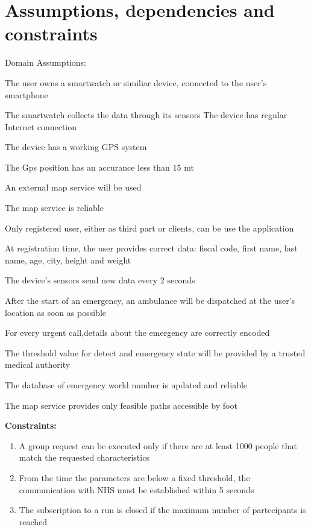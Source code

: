 \section{Assumptions, dependencies and constraints}
Domain Assumptions:
\begin{enumerate}[label={[}D.\arabic*{]}]

\item \label{d:1}
The user owns a smartwatch or similiar device, connected to the user’s smartphone
\item\label{d:2}
The smartwatch collects the data through its sensors
\itm\label{d:3}
The device has regular Internet connection 
\item\label{d:4}
The device has a working GPS system 
\item\label{d:4}
The Gps position has an accurance less than 15 mt
\item\label{d:5}
An external map service will be used
\item\label{d:6}
The map service is reliable
\item\label{d:7}
Only registered user, either as third part or clients, can be use the application
\item\label{d:8}
At registration time, the user provides correct data: fiscal code, first name, last name, age, city, height and weight
\item\label{d:9}
The device’s sensors send new data every 2 seconds
\item\label{d:10}
After the start of an emergency, an ambulance will be dispatched at the user’s location as soon as possible
\item\label{d:11}
For every urgent call,details about the emergency are correctly encoded
\item\label{d:12}
The threshold value for detect and emergency state will be provided by a trusted medical authority
\item\label{d:13}
The database of emergency world number is updated and reliable
\item\label{d:14}
The map service provides only feasible paths accessible by foot
\end{enumerate}

\textbf{Constraints:}

\begin{enumerate}
    \item\label{c:1}	A group request can be executed only if there are at least 1000 people that match the requested characteristics 
    \item\label{c:2}
    From the time the parameters are below a fixed threshold, the communication with NHS must be established within 5 seconds
    \item\label{c:3}
    The subscription to a run is closed if the maximum number of partecipants is reached
\end{enumerate}


